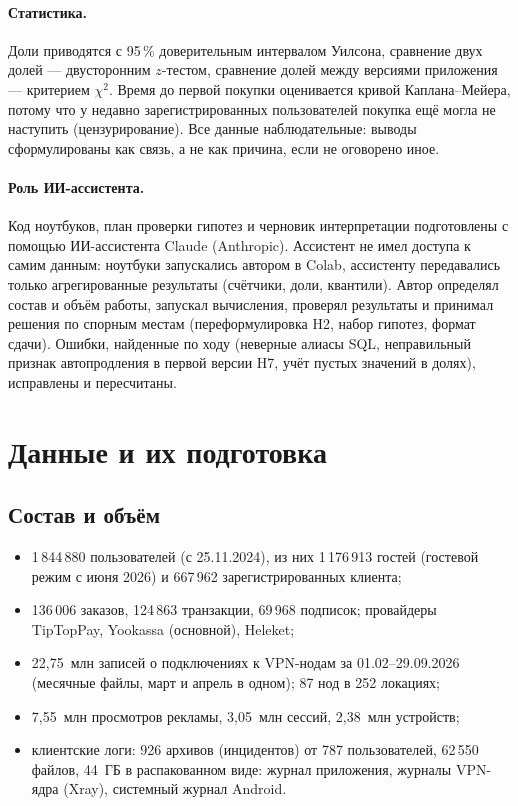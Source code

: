 \documentclass[11pt,a4paper]{article}
\begin{document}
\paragraph{Статистика.} Доли приводятся с 95\,\% доверительным интервалом Уилсона, сравнение двух долей --- двусторонним $z$-тестом, сравнение долей между версиями приложения --- критерием $\chi^2$. Время до первой покупки оценивается кривой Каплана--Мейера, потому что у недавно зарегистрированных пользователей покупка ещё могла не наступить (цензурирование). Все данные наблюдательные: выводы сформулированы как связь, а не как причина, если не оговорено иное.

\paragraph{Роль ИИ-ассистента.} Код ноутбуков, план проверки гипотез и черновик интерпретации подготовлены с помощью ИИ-ассистента Claude (Anthropic). Ассистент не имел доступа к самим данным: ноутбуки запускались автором в Colab, ассистенту передавались только агрегированные результаты (счётчики, доли, квантили). Автор определял состав и объём работы, запускал вычисления, проверял результаты и принимал решения по спорным местам (переформулировка H2, набор гипотез, формат сдачи). Ошибки, найденные по ходу (неверные алиасы SQL, неправильный признак автопродления в первой версии H7, учёт пустых значений в долях), исправлены и пересчитаны.

\section{Данные и их подготовка}

\subsection{Состав и объём}
\begin{itemize}
  \item 1\,844\,880 пользователей (с 25.11.2024), из них 1\,176\,913 гостей (гостевой режим с июня 2026) и 667\,962 зарегистрированных клиента;
  \item 136\,006 заказов, 124\,863 транзакции, 69\,968 подписок; провайдеры TipTopPay, Yookassa (основной), Heleket;
  \item 22,75~млн записей о подключениях к VPN-нодам за 01.02--29.09.2026 (месячные файлы, март и апрель в одном); 87 нод в 252 локациях;
  \item 7,55~млн просмотров рекламы, 3,05~млн сессий, 2,38~млн устройств;
  \item клиентские логи: 926 архивов (инцидентов) от 787 пользователей, 62\,550 файлов, 44~ГБ в распакованном виде: журнал приложения, журналы VPN-ядра (Xray), системный журнал Android.
\end{itemize}
\end{document}
